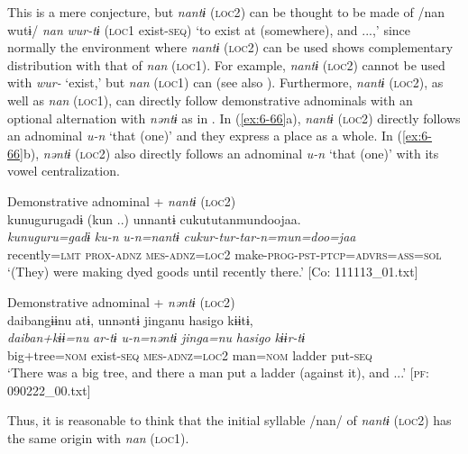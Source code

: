 This is a mere conjecture, but \textit{nantɨ} (\textsc{loc2}) can be thought to be made of /nan wutɨ/ \textit{nan} \textit{wur-tɨ} (\textsc{loc1} exist-\textsc{seq}) ‘to exist at (somewhere), and ...,’ since normally the environment where \textit{nantɨ} (\textsc{loc2}) can be used shows complementary distribution with that of \textit{nan} (\textsc{loc1}). For example, \textit{nantɨ} (\textsc{loc2}) cannot be used with \textit{wur-} ‘exist,’ but \textit{nan} (\textsc{loc1}) can (see also ). Furthermore, \textit{nantɨ} (\textsc{loc2}), as well as \textit{nan} (\textsc{loc1}), can directly follow demonstrative adnominals with an optional alternation with \textit{nəntɨ} as in . In (\ref{ex:6-66}a), \textit{nantɨ} (\textsc{loc2}) directly follows an adnominal \textit{u-n} ‘that (one)’ and they express a place as a whole. In (\ref{ex:6-66}b), \textit{nəntɨ} (\textsc{loc2}) also directly follows an adnominal \textit{u-n} ‘that (one)’ with its vowel centralization.

\ea\label{ex:6-66}
\ea Demonstrative adnominal + \textit{nantɨ} (\textsc{loc2})\\
{\TM}
\glll  kunugurugadɨ  (kun ..)  unnantɨ cukututanmundoojaa.\\
\textit{kunuguru=gadɨ}  \textit{ku-n}  \textit{u-n=nantɨ}   \textit{cukur-tur-tar-n=mun=doo=jaa}\\
recently=\textsc{lmt}  \textsc{prox}-\textsc{adnz}  \textsc{mes}-\textsc{adnz}=\textsc{loc2}   make-\textsc{prog}-\textsc{pst}-\textsc{ptcp}=\textsc{advrs}=\textsc{ass}=\textsc{sol}\\
\glt ‘(They) were making dyed goods until recently there.’ [Co: 111113\_01.txt]

\ex Demonstrative adnominal + \textit{nəntɨ} (\textsc{loc2})\\
{\TM}
\glll  daibangɨɨnu  atɨ,  unnəntɨ  jinganu  {\textbar}hasigo{\textbar}  kɨɨtɨ,\\
\textit{daiban+kɨɨ=nu}  \textit{ar-tɨ}  \textit{u-n=nəntɨ}  \textit{jinga=nu}  \textit{hasigo}  \textit{kɨɨr-tɨ}\\
big+tree=\textsc{nom}  exist-\textsc{seq}  \textsc{mes}-\textsc{adnz}=\textsc{loc2}  man=\textsc{nom}  ladder  put-\textsc{seq}\\
\glt ‘There was a big tree, and there a man put a ladder (against it), and ...’ [\textsc{pf}: 090222\_00.txt]
\z
\z

Thus, it is reasonable to think that the initial syllable /nan/ of \textit{nantɨ} (\textsc{loc2}) has the same origin with \textit{nan} (\textsc{loc1}).

